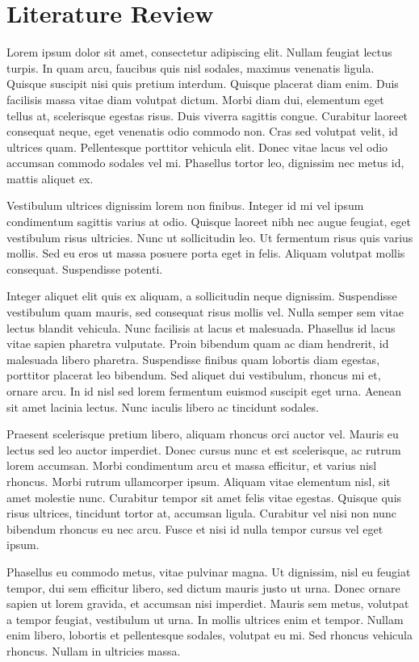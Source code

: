 \chapter{Literature Review}
\label{chap:lit_review}

Lorem ipsum dolor sit amet, consectetur adipiscing elit. Nullam feugiat lectus turpis. In quam arcu, faucibus quis nisl sodales, maximus venenatis ligula. Quisque suscipit nisi quis pretium interdum. Quisque placerat diam enim. Duis facilisis massa vitae diam volutpat dictum. Morbi diam dui, elementum eget tellus at, scelerisque egestas risus. Duis viverra sagittis congue. Curabitur laoreet consequat neque, eget venenatis odio commodo non. Cras sed volutpat velit, id ultrices quam. Pellentesque porttitor vehicula elit. Donec vitae lacus vel odio accumsan commodo sodales vel mi. Phasellus tortor leo, dignissim nec metus id, mattis aliquet ex.

Vestibulum ultrices dignissim lorem non finibus. Integer id mi vel ipsum condimentum sagittis varius at odio. Quisque laoreet nibh nec augue feugiat, eget vestibulum risus ultricies. Nunc ut sollicitudin leo. Ut fermentum risus quis varius mollis. Sed eu eros ut massa posuere porta eget in felis. Aliquam volutpat mollis consequat. Suspendisse potenti.

Integer aliquet elit quis ex aliquam, a sollicitudin neque dignissim. Suspendisse vestibulum quam mauris, sed consequat risus mollis vel. Nulla semper sem vitae lectus blandit vehicula. Nunc facilisis at lacus et malesuada. Phasellus id lacus vitae sapien pharetra vulputate. Proin bibendum quam ac diam hendrerit, id malesuada libero pharetra. Suspendisse finibus quam lobortis diam egestas, porttitor placerat leo bibendum. Sed aliquet dui vestibulum, rhoncus mi et, ornare arcu. In id nisl sed lorem fermentum euismod suscipit eget urna. Aenean sit amet lacinia lectus. Nunc iaculis libero ac tincidunt sodales.

Praesent scelerisque pretium libero, aliquam rhoncus orci auctor vel. Mauris eu lectus sed leo auctor imperdiet. Donec cursus nunc et est scelerisque, ac rutrum lorem accumsan. Morbi condimentum arcu et massa efficitur, et varius nisl rhoncus. Morbi rutrum ullamcorper ipsum. Aliquam vitae elementum nisl, sit amet molestie nunc. Curabitur tempor sit amet felis vitae egestas. Quisque quis risus ultrices, tincidunt tortor at, accumsan ligula. Curabitur vel nisi non nunc bibendum rhoncus eu nec arcu. Fusce et nisi id nulla tempor cursus vel eget ipsum.

Phasellus eu commodo metus, vitae pulvinar magna. Ut dignissim, nisl eu feugiat tempor, dui sem efficitur libero, sed dictum mauris justo ut urna. Donec ornare sapien ut lorem gravida, et accumsan nisi imperdiet. Mauris sem metus, volutpat a tempor feugiat, vestibulum ut urna. In mollis ultrices enim et tempor. Nullam enim libero, lobortis et pellentesque sodales, volutpat eu mi. Sed rhoncus vehicula rhoncus. Nullam in ultricies massa.

